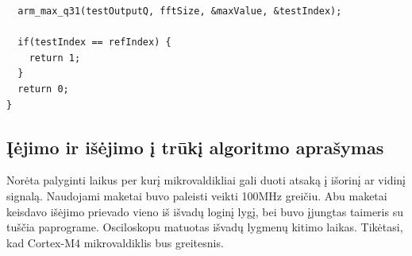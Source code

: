 \documentclass[a4paper, 12pt]{article} %
\begin{document}
\begin{onehalfspacing}
\begin{verbatim}
  arm_max_q31(testOutputQ, fftSize, &maxValue, &testIndex); 

  if(testIndex == refIndex) { 
    return 1;
  } 
  return 0;
}
\end{verbatim}
\subsection{\k{I}\.ejimo ir i\v{s}\.ejimo \k{i} tr\=uk\k{i} algoritmo apra\v{s}ymas}
Nor\.{e}ta palyginti laikus per kur\k{i} mikrovaldikliai gali duoti atsak\k{a} \k{i} i\v{s}orin\k{i} ar vidin\k{i} signal\k{a}. 
Naudojami maketai buvo paleisti veikti 100MHz grei\v{c}iu. Abu maketai keisdavo i\v{s}\.ejimo prievado vieno i\v{s} i\v{s}vad\k{u} login\k{i} lyg\k{i}, bei buvo \k{i}jungtas taimeris su tu\v{s}\v{c}ia paprograme. Osciloskopu matuotas i\v{s}vad\k{u} lygmen\k{u} kitimo laikas. Tik\.{e}tasi, kad Cortex-M4 mikrovaldiklis bus greitesnis.

\end{onehalfspacing}
\end{document}

